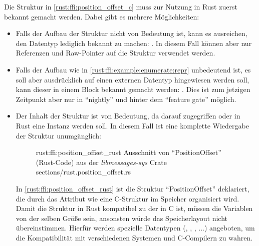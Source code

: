 Die Struktur in \autoref{rust:ffi:position_offset_c} muss zur Nutzung in Rust zuerst bekannt gemacht werden.
Dabei gibt es mehrere Möglichkeiten:
\begin{itemize}
	\item Falls der Aufbau der Struktur nicht von Bedeutung ist, kann es ausreichen, den Datentyp lediglich bekannt zu machen: .
	In diesem Fall können aber nur Referenzen und Raw-Pointer auf die Struktur verwendet werden.
	\label{rust:ffi:example:enumerate:repr}
	
	\item Falls der Aufbau wie in \autoref{rust:ffi:example:enumerate:repr} unbedeutend ist, es soll aber ausdrücklich auf einen externen Datentyp hingewiesen werden soll, kann dieser in einem  Block bekannt gemacht werden:  \cite{rust:github:extern_type}.
	Dies ist zum jetzigen Zeitpunkt aber nur in \enquote{nightly} und hinter dem \enquote{feature gate}  möglich.
	
	\item Der Inhalt der Struktur ist von Bedeutung, da darauf zugegriffen oder in Rust eine Instanz werden soll. In diesem Fall ist eine komplette Wiedergabe der Struktur unumgänglich:
	\begin{figure}[H]
		\rustcinclude
			{rust:ffi:position_offset_rust}
			{Ausschnitt von \enquote{PositionOffset} (Rust-Code) aus der \textit{libmessages-sys} Crate}
			{sections/rust.position_offset.rs}
	\end{figure}
	
	In \autoref{rust:ffi:position_offset_rust} ist die Struktur \enquote{PositionOffset} deklariert,
	die durch das Attribut \rustcinline{#[repr(C)]} wie eine C-Struktur im Speicher organisiert wird.
	Damit die Struktur in Rust kompatibel zu der in C ist, müssen die Variablen von der selben Größe sein, ansonsten würde das Speicherlayout nicht übereinstimmen.
	Hierfür werden spezielle Datentypen (, , , ...) angeboten, um die Kompatibilität mit verschiedenen Systemen und C-Compilern zu wahren.
	
	
	

\end{itemize}
